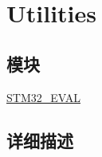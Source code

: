 \hypertarget{group___utilities}{}\section{Utilities}
\label{group___utilities}
\subsection*{模块}
\begin{DoxyCompactItemize}
\item 
\hyperlink{group___s_t_m32___e_v_a_l}{S\+T\+M32\+\_\+\+E\+V\+AL}
\end{DoxyCompactItemize}


\subsection{详细描述}
